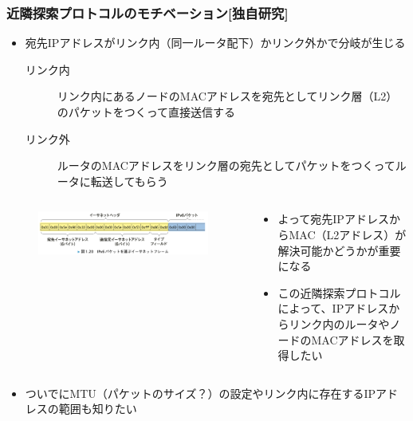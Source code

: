 \begin{frame}
  \frametitle{近隣探索プロトコルのモチベーション[独自研究]}

  \begin{itemize}
    \item 宛先IPアドレスがリンク内（同一ルータ配下）かリンク外かで分岐が生じる
    \begin{description}
      \item[リンク内] リンク内にあるノードのMACアドレスを宛先としてリンク層（L2）のパケットをつくって直接送信する
      \item[リンク外] ルータのMACアドレスをリンク層の宛先としてパケットをつくってルータに転送してもらう
    \end{description}
  \end{itemize}

  \begin{columns}
    \begin{column}{0.5\textwidth}
      \begin{center}
        \begin{figure}
          \includegraphics[width=0.99\textwidth]{img/figure1_20.png}
        \end{figure}
      \end{center}
    \end{column}
    \begin{column}{0.5\textwidth}
      \begin{itemize}
        \item よって宛先IPアドレスからMAC（L2アドレス）が解決可能かどうかが重要になる

        \item この近隣探索プロトコルによって、IPアドレスからリンク内のルータやノードのMACアドレスを取得したい
      \end{itemize}
    \end{column}
  \end{columns}
  \begin{itemize}
    \item ついでにMTU（パケットのサイズ？）の設定やリンク内に存在するIPアドレスの範囲も知りたい
  \end{itemize}
\end{frame}

